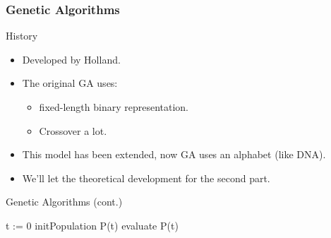 \begin{frame}
  \frametitle{Genetic Algorithms}
  \begin{block}{History}
    \begin{itemize}[<+->]
    \item Developed by Holland\cite{Holland1992}.
    \item The original GA uses:
      \begin{itemize}[<+->]
        \item fixed-length binary representation.
        \item Crossover a lot.
      \end{itemize}
    \item This model has been extended, now GA uses an alphabet (like DNA).
    \item We'll let the theoretical development for the second part.
    \end{itemize}
  \end{block}
\end{frame}

\begin{frame}{Genetic Algorithms (cont.)}
    \begin{algorithmic}
      \State t := 0
      \State initPopulation P(t)
      \State evaluate P(t)
    \end{algorithmic}
\end{frame}


